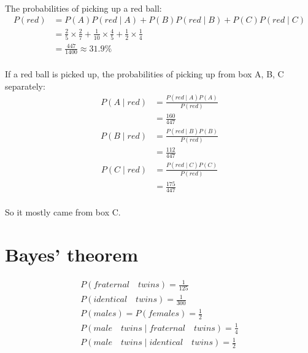 \documentclass{article}
\begin{document}
   \paragraph{}The probabilities of picking up a red ball:
    \begin{equation*}
     \begin{aligned}
     P(red)&=P(A)P(red \mid A)+P(B)P(red \mid B)+P(C)P(red \mid C)\\
     	   &=\frac{2}{5} \times \frac{2}{7} + \frac{1}{10} \times \frac{4}{5} + \frac{1}{2} \times \frac{1}{4}\\
     	   &= \frac{447}{1400} \approx 31.9\%
     \end{aligned}
    \end{equation*}
   \paragraph{}If a red ball is picked up, the probabilities of picking up from box A, B, C separately:
   \begin{equation*}
  	 \begin{aligned}
  			P(A \mid red)&=\frac{P(red \mid A)P(A)}{P(red)}\\
  						&= \frac{160}{447}
  	 \end{aligned} 		
  	\end{equation*}
   \begin{equation*}
  	\begin{aligned}
  			P(B \mid red)&=\frac{P(red \mid B)P(B)}{P(red)}\\
						&= \frac{112}{447}
  	\end{aligned} 		
   \end{equation*}
   \begin{equation*}
  	\begin{aligned}
  			P(C \mid red)&=\frac{P(red \mid C)P(C)}{P(red)}\\
  						&= \frac{175}{447}
  	\end{aligned} 		
   \end{equation*}
   \paragraph{}So it mostly came from box C.
  
  \section{Bayes' theorem}	
  	\begin{gather*}
  		P(fraternal \quad twins)= \frac{1}{125} \\
  		P(identical \quad twins)= \frac{1}{300} \\
  		P(males)=P(females)= \frac{1}{2}\\
  		P(male \quad twins \mid fraternal \quad twins)= \frac{1}{4} \\
  		P(male \quad twins \mid identical \quad twins)= \frac{1}{2}
  	\end{gather*}
\end{document}
